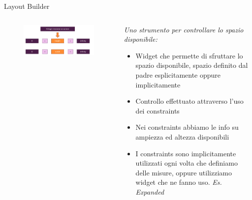 \documentclass{../libs/presentation_format}
\begin{document}

\begin{frame}{Layout Builder}
	\begin{minipage}[0.2\textheight]{\textwidth}
		\begin{columns}[T]
			\begin{column}{0.4\textwidth}
				\begin{figure}[htpb]
					\centering
					\includegraphics[scale=0.2]{../libs/constraints-layout}
				\end{figure}
			\end{column}
			\begin{column}{0.6\textwidth}
				\emph{Uno strumento per controllare lo spazio disponibile:}
				\begin{itemize}
					\item Widget che permette di sfruttare lo spazio disponibile, spazio definito dal padre esplicitamente oppure implicitamente
					\item Controllo effettuato attraverso l'uso dei constraints
					\item Nei constraints abbiamo le info su ampiezza ed altezza disponibili
					\item I constraints sono implicitamente utilizzati ogni volta che definiamo delle misure, oppure utilizziamo widget che ne fanno uso. \emph{Es. Expanded}
				\end{itemize}
			\end{column}
		\end{columns}
	\end{minipage}
\end{frame}

\end{document}
